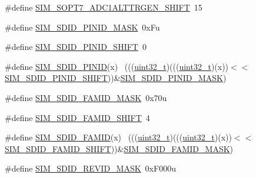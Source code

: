 \begin{DoxyCompactItemize}
\item 
\#define \hyperlink{group___s_i_m___register___masks_gab364156b2cb9b83329803bdc8c0c589e}{S\+I\+M\+\_\+\+S\+O\+P\+T7\+\_\+\+A\+D\+C1\+A\+L\+T\+T\+R\+G\+E\+N\+\_\+\+S\+H\+I\+FT}~15
\item 
\#define \hyperlink{group___s_i_m___register___masks_gaf0820acb74ce8270da2025fee624b47c}{S\+I\+M\+\_\+\+S\+D\+I\+D\+\_\+\+P\+I\+N\+I\+D\+\_\+\+M\+A\+SK}~0x\+Fu
\item 
\#define \hyperlink{group___s_i_m___register___masks_ga593faac0d0629fde52f6fe4b83614c23}{S\+I\+M\+\_\+\+S\+D\+I\+D\+\_\+\+P\+I\+N\+I\+D\+\_\+\+S\+H\+I\+FT}~0
\item 
\#define \hyperlink{group___s_i_m___register___masks_ga3ab62e28831b168141d554c707ac5c87}{S\+I\+M\+\_\+\+S\+D\+I\+D\+\_\+\+P\+I\+N\+ID}(x)                                            ~(((\hyperlink{_p_e___types_8h_a33594304e786b158f3fb30289278f5af}{uint32\+\_\+t})(((\hyperlink{_p_e___types_8h_a33594304e786b158f3fb30289278f5af}{uint32\+\_\+t})(x))$<$$<$\hyperlink{group___s_i_m___register___masks_ga593faac0d0629fde52f6fe4b83614c23}{S\+I\+M\+\_\+\+S\+D\+I\+D\+\_\+\+P\+I\+N\+I\+D\+\_\+\+S\+H\+I\+FT}))\&\hyperlink{group___s_i_m___register___masks_gaf0820acb74ce8270da2025fee624b47c}{S\+I\+M\+\_\+\+S\+D\+I\+D\+\_\+\+P\+I\+N\+I\+D\+\_\+\+M\+A\+SK})
\item 
\#define \hyperlink{group___s_i_m___register___masks_ga5344e7283b2aead14d9d3bded0114f3b}{S\+I\+M\+\_\+\+S\+D\+I\+D\+\_\+\+F\+A\+M\+I\+D\+\_\+\+M\+A\+SK}~0x70u
\item 
\#define \hyperlink{group___s_i_m___register___masks_ga377bc761e6ee1caab79baad3e2d0d331}{S\+I\+M\+\_\+\+S\+D\+I\+D\+\_\+\+F\+A\+M\+I\+D\+\_\+\+S\+H\+I\+FT}~4
\item 
\#define \hyperlink{group___s_i_m___register___masks_ga1c53c57d3312af915fc5419efec0b651}{S\+I\+M\+\_\+\+S\+D\+I\+D\+\_\+\+F\+A\+M\+ID}(x)                                            ~(((\hyperlink{_p_e___types_8h_a33594304e786b158f3fb30289278f5af}{uint32\+\_\+t})(((\hyperlink{_p_e___types_8h_a33594304e786b158f3fb30289278f5af}{uint32\+\_\+t})(x))$<$$<$\hyperlink{group___s_i_m___register___masks_ga377bc761e6ee1caab79baad3e2d0d331}{S\+I\+M\+\_\+\+S\+D\+I\+D\+\_\+\+F\+A\+M\+I\+D\+\_\+\+S\+H\+I\+FT}))\&\hyperlink{group___s_i_m___register___masks_ga5344e7283b2aead14d9d3bded0114f3b}{S\+I\+M\+\_\+\+S\+D\+I\+D\+\_\+\+F\+A\+M\+I\+D\+\_\+\+M\+A\+SK})
\item 
\#define \hyperlink{group___s_i_m___register___masks_gafefd91d0385c1b93049ec14409ed6b1e}{S\+I\+M\+\_\+\+S\+D\+I\+D\+\_\+\+R\+E\+V\+I\+D\+\_\+\+M\+A\+SK}~0x\+F000u

\end{DoxyCompactItemize}
